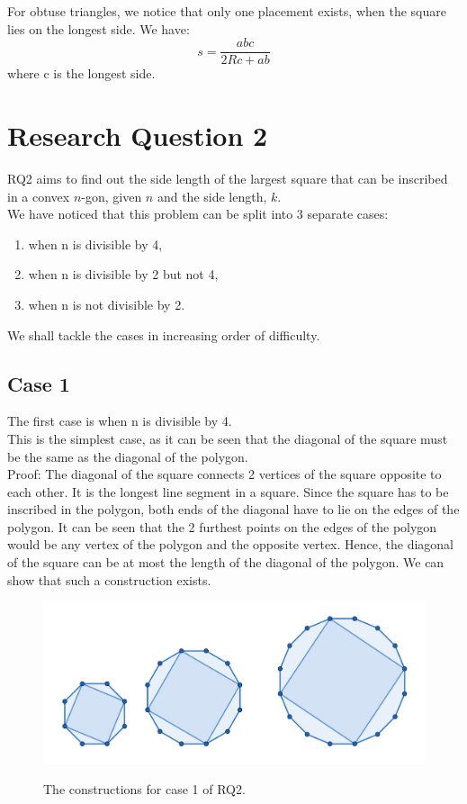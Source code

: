 \documentclass[12pt]{scrartcl}
\begin{document}
For obtuse triangles, we notice that only one placement exists, when the square lies on the longest side. We have:
\begin{equation}
	s = \dfrac{abc}{2Rc+ab}
\end{equation}
where c is the longest side.

\clearpage

\section{Research Question 2}

RQ2 aims to find out the side length of the largest
square that can be inscribed in a convex $n$-gon, given $n$ and the side length, $k$. \\

We have noticed that this problem can be split into 3 separate cases:
\begin{enumerate}
	\item when n is divisible by 4, 
	\item when n is divisible by 2 but not 4,
	\item when n is not divisible by 2.
\end{enumerate}
We shall tackle the cases in increasing order of difficulty.

\clearpage

\subsection{Case 1}

The first case is when n is divisible by 4. \\
This is the simplest case, as it can be seen that the diagonal of the square must be the same as the diagonal of the polygon. \\
Proof: The diagonal of the square connects 2 vertices of the square opposite to each other. It is the longest line segment in a square. 
Since the square has to be inscribed in the polygon, both ends of the diagonal have to lie on the edges of the polygon. 
It can be seen that the 2 furthest points on the edges of the polygon would be any vertex of the polygon and the opposite vertex. 
Hence, the diagonal of the square can be at most the length of the diagonal of the polygon. 
We can show that such a construction exists. \\

\begin{figure}[h!]
	\centering
	\includegraphics[scale=.75]{images/rq2_1_1.jpg}
	\label{fig:rq2_1_1_img}
	\caption{The constructions for case 1 of RQ2.}
\end{figure}
\end{document}
